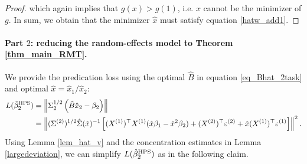 \begin{proof}
which again implies that $g(x)>g(1)$, i.e. $x$ cannot be the minimizer of $g$. In sum, we obtain that the minimizer $\hat x$ must satisfy equation \eqref{hatw_add1}.
%
\end{proof}

\paragraph{Part $2$: reducing the random-effects model to Theorem \ref{thm_main_RMT}.}
We provide the predication loss using the optimal $\hat B$ in equation \eqref{eq_Bhat_2task} and optimal $\hat x=\hat x_1/\hat x_2$:
\begin{align}
L(\hat{\beta}_2^{\textup{HPS}}) &=\left\|\Sigma_2^{1/2} \left( \hat B \hat x_2 - \beta_2\right)\right\| \nonumber\\
&=  \left\| (\Sigma^{(2)})^{1/2}\hat \Sigma(\hat x)^{-1} \left[(X^{(1)})^\top X^{(1)} (\hat x\beta_1-\hat x^2\beta_2)+ (X^{(2)})^\top \varepsilon^{(2)} + \hat x   (X^{(1)})^\top \varepsilon^{(1)} \right]\right\|^2.\label{Lbeta_HPS}
\end{align}
Using Lemma \ref{lem_hat_v} and the concentration estimates in Lemma \ref{largedeviation}, we can simplify $L(\hat{\beta}_2^{\textup{HPS}})$ as in the following claim. 

